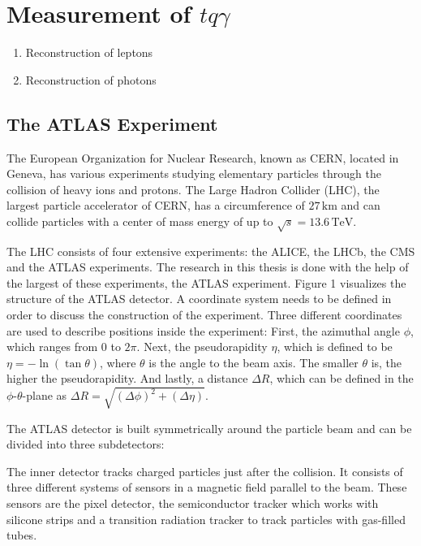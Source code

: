 


\chapter{Measurement of \texorpdfstring{$tq\gamma$}{tqGamma}}
\label{chap:measurement}

\begin{enumerate}
    \item Reconstruction of leptons
    \item Reconstruction of photons
\end{enumerate}
\section{The ATLAS Experiment}
\label{sec:atlas}
The European Organization for Nuclear Research, known as CERN, located in Geneva, has various experiments studying elementary particles through the collision of heavy ions and protons. 
The Large Hadron Collider (LHC), the largest particle accelerator of CERN, has a circumference of $27 \,\si{\kilo\metre}$ and can collide particles with a center of mass energy of up to $\sqrt{s} = 13.6 \,\si{\tera\electronvolt}$. 


The LHC consists of four extensive experiments: the ALICE, the LHCb, the CMS and the ATLAS experiments. The research in this thesis is done with the help of the largest of these experiments, the ATLAS experiment. Figure 1 visualizes the structure of the ATLAS detector. 
A coordinate system needs to be defined in order to discuss the construction of the experiment. Three different coordinates are used to describe positions inside the experiment: First, the azimuthal angle $\phi$, which ranges from $0$ to $2\pi$. 
Next, the pseudorapidity $\eta$, which is defined to be $\eta = -\ln(\tan \theta)$, where $\theta$ is the angle to the beam axis. The smaller $\theta$ is, the higher the pseudorapidity. And lastly, a distance $\Delta R$, which can be defined in the $\phi$-$\theta$-plane as $\Delta R = \sqrt{(\Delta \phi)^2 +(\Delta \eta)}$.

The ATLAS detector is built symmetrically around the particle beam and can be divided into three subdetectors:

The inner detector tracks charged particles just after the collision. 
It consists of three different systems of sensors in a magnetic field parallel to the beam. 
These sensors are the pixel detector, the semiconductor tracker which works with silicone strips and a transition radiation tracker to track particles with gas-filled tubes. 

